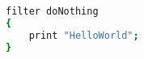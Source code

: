 \begin{lstlisting}[language=bash, caption={Filter definition.}]
filter doNothing
{
    print "HelloWorld";
}
\end{lstlisting}